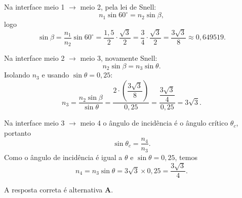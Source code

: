 \begin{flushleft}
Na interface meio 1 $\to$ meio 2, pela lei de Snell:
\[
n_1\sin 60^\circ = n_2\sin\beta,
\]
logo
\[
\sin\beta=\frac{n_1}{n_2}\sin60^\circ=\frac{1{,}5}{2}\cdot\frac{\sqrt{3}}{2}
=\frac{3}{4}\cdot\frac{\sqrt{3}}{2}=\frac{3\sqrt{3}}{8}\approx 0{,}649519.
\]

Na interface meio 2 $\to$ meio 3, novamente Snell:
\[
n_2\sin\beta = n_3\sin\theta.
\]
Isolando $n_3$ e usando $\sin\theta=0{,}25$:
\[
n_3=\frac{n_2\sin\beta}{\sin\theta}
= \frac{2\cdot\left(\dfrac{3\sqrt{3}}{8}\right)}{0{,}25}
= \frac{\dfrac{3\sqrt{3}}{4}}{0{,}25}
= 3\sqrt{3}.
\]

Na interface meio 3 $\to$ meio 4 o ângulo de incidência é o ângulo crítico $\theta_c$, portanto
\[
\sin\theta_c=\frac{n_4}{n_3}.
\]
Como o ângulo de incidência é igual a $\theta$ e $\sin\theta=0{,}25$, temos
\[
n_4 = n_3\sin\theta = 3\sqrt{3}\times 0{,}25 = \frac{3\sqrt{3}}{4}.
\]

A resposta correta é alternativa \colorbox{green!50}{\textbf{A}}.

\end{flushleft}


